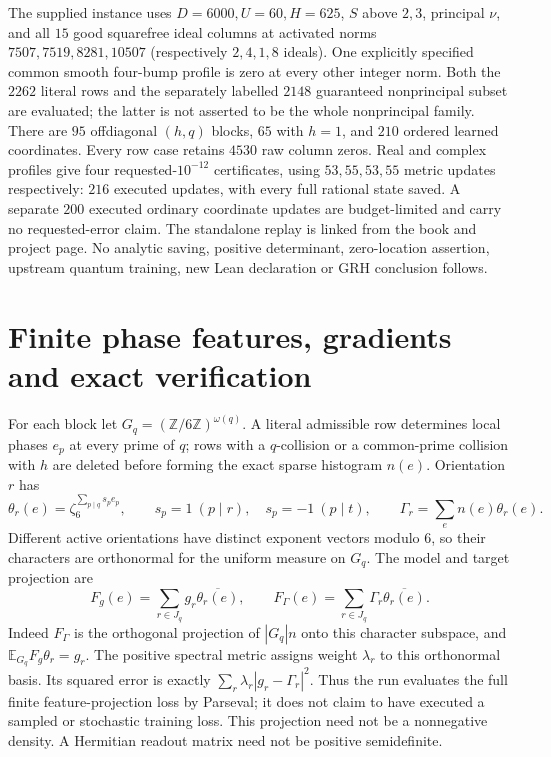 \documentclass[11pt]{article}
\theoremstyle{definition}\newtheorem{definition}[theorem]{Definition}
\theoremstyle{remark}\newtheorem{remark}[theorem]{Remark}
\begin{document}
The supplied instance uses $D=6000,U=60,H=625$, $S$ above $2,3$, principal
$\nu$, and all $15$ good squarefree ideal columns at activated norms
$7507,7519,8281,10507$ (respectively $2,4,1,8$ ideals).
One explicitly specified common smooth four-bump profile is zero at every
other integer norm. Both the $2262$ literal rows and the separately labelled
$2148$ guaranteed nonprincipal subset are evaluated; the latter is not
asserted to be the whole nonprincipal family.
There are $95$ offdiagonal $(h,q)$ blocks, $65$ with $h=1$, and $210$
ordered learned coordinates. Every row case retains $4530$ raw column zeros.
Real and complex profiles give four requested-$10^{-12}$ certificates,
using $53,55,53,55$ metric updates respectively: $216$ executed updates,
with every full rational state saved. A separate $200$ executed ordinary
coordinate updates are budget-limited and carry no requested-error claim.
The standalone replay is linked from the book and project page.
No analytic saving, positive determinant, zero-location assertion,
upstream quantum training, new Lean declaration or GRH conclusion follows.

\section{Finite phase features, gradients and exact verification}\label{arl:details}
For each block let $G_q=(\mathbb Z/6\mathbb Z)^{\omega(q)}$.
A literal admissible row determines local phases $e_p$ at every prime of $q$;
rows with a $q$-collision or a common-prime collision with $h$ are deleted
before forming the exact sparse histogram $n(e)$. Orientation $r$ has
\[
 \theta_r(e)=\zeta_6^{\sum_{p\mid q}s_p e_p},\qquad
 s_p=1\ (p\mid r),\quad s_p=-1\ (p\mid t),\qquad
 \Gamma_r=\sum_e n(e)\theta_r(e).
\]
Different active orientations have distinct exponent vectors modulo $6$,
so their characters are orthonormal for the uniform measure on $G_q$.
The model and target projection are
\[
 F_g(e)=\sum_{r\in J_q}g_r\overline{\theta_r(e)},\qquad
 F_\Gamma(e)=\sum_{r\in J_q}\Gamma_r\overline{\theta_r(e)}.
\]
Indeed $F_\Gamma$ is the orthogonal projection of $|G_q|n$ onto this
character subspace, and $\mathbb E_{G_q}F_g\theta_r=g_r$.
The positive spectral metric assigns weight $\lambda_r$ to this orthonormal
basis. Its squared error is exactly $\sum_r\lambda_r|g_r-\Gamma_r|^2$.
Thus the run evaluates the full finite feature-projection loss by Parseval;
it does not claim to have executed a sampled or stochastic training loss.
This projection need not be a nonnegative density. A Hermitian readout matrix
need not be positive semidefinite.
\end{document}

